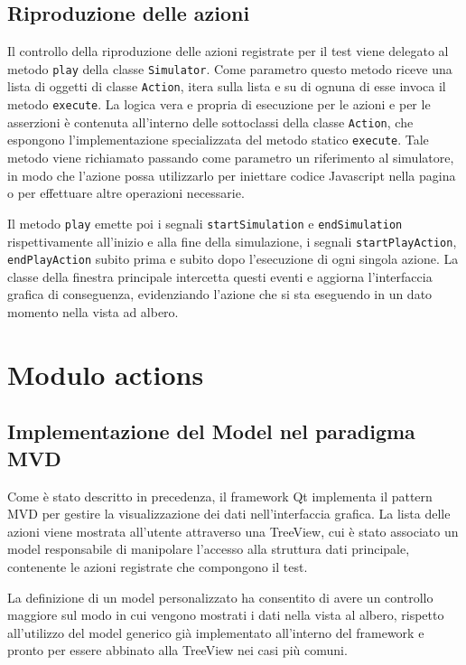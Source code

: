 \subsection{Riproduzione delle azioni}

Il controllo della riproduzione delle azioni registrate per il test viene delegato al metodo \verb|play| della classe \verb|Simulator|. Come parametro questo metodo riceve una lista di oggetti di classe \verb|Action|, itera sulla lista e su di  ognuna di esse invoca il metodo \verb|execute|. La logica vera e propria di esecuzione per le azioni e per le asserzioni è contenuta all'interno delle sottoclassi della classe \verb|Action|, che espongono l'implementazione specializzata del metodo statico \verb|execute|. Tale metodo viene richiamato passando come parametro un riferimento al simulatore, in modo che l'azione possa utilizzarlo per iniettare codice Javascript nella pagina o per effettuare altre operazioni necessarie.

Il metodo \verb|play| emette poi i segnali \verb|startSimulation| e \verb|endSimulation| rispettivamente all'inizio e alla fine della simulazione, i segnali \verb|startPlayAction|, \verb|endPlayAction| subito prima e subito dopo l'esecuzione di ogni singola azione. La classe della finestra principale intercetta questi eventi e aggiorna l'interfaccia grafica di conseguenza, evidenziando l'azione che si sta eseguendo in un dato momento nella vista ad albero.

\section{Modulo actions}

\subsection{Implementazione del Model nel paradigma MVD}

Come è stato descritto in precedenza, il framework Qt implementa il pattern MVD per gestire la visualizzazione dei dati nell'interfaccia grafica. La lista delle azioni viene mostrata all'utente attraverso una TreeView, cui è stato associato un model responsabile di manipolare l'accesso alla struttura dati principale, contenente le azioni registrate che compongono il test. 

La definizione di un model personalizzato ha consentito di avere un controllo maggiore sul modo in cui vengono mostrati i dati nella vista al albero, rispetto all'utilizzo del model generico già implementato all'interno del framework e pronto per essere abbinato alla TreeView nei casi più comuni. 

